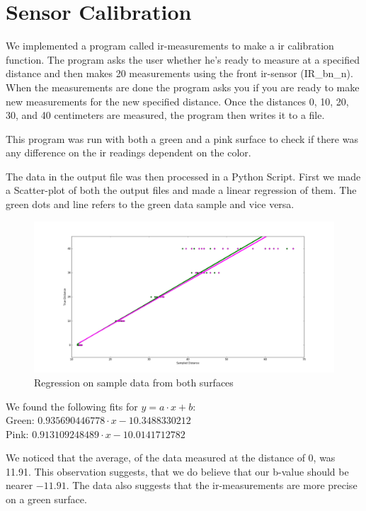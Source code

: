 \documentclass[a4paper,12pt]{article}
\begin{document}
\newpage
\section{Sensor Calibration}

We implemented a program called ir-measurements to make a ir calibration function. The program asks the user whether he's ready to measure at a specified distance and then makes 20 measurements using the front ir-sensor (IR\_bn\_n). When the measurements are done the program asks you if you are ready to make new measurements for the new specified distance. Once the distances 0, 10, 20, 30, and 40 centimeters are measured, the program then writes it to a file.

This program was run with both a green and a pink surface to check if there was any difference on the ir readings dependent on the color.

The data in the output file was then processed in a Python Script. First we made a Scatter-plot of both the output files and made a linear regression of them. The green dots and line refers to the green data sample and vice versa.   

\begin{figure}[!h]
\hspace{-6cm}
\includegraphics[scale=0.5]{reg_mix}
\caption{Regression on sample data from both surfaces}
\label{fig:mixed_reg}
\end{figure}

We found the following fits for $y = a\cdot x + b$:\\
Green: $0.935690446778\cdot x-10.3488330212$\\
Pink: $0.913109248489\cdot x-10.0141712782$

We noticed that the average, of the data measured at the distance of 0, was 11.91. This observation suggests, that we do believe that our b-value should be nearer $-11.91$. 
The data also suggests that the ir-measurements are more precise on a green surface.
\newpage
\end{document}
